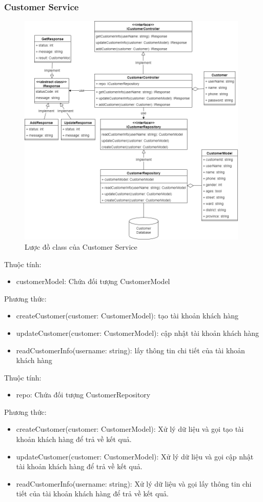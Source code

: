 \subsubsection{Customer Service}
\begin{figure}[!htp]
	\centering
	\includegraphics[width=11cm]{img/Architecture/service/CustomerService.png}
	\newline
	\caption{Lược đồ class của Customer Service}
\end{figure}

	Thuộc tính:
	\begin{itemize}
		\item customerModel: Chứa đối tượng CustomerModel
	\end{itemize}
	Phương thức:
	\begin{itemize}
		\item createCustomer(customer: CustomerModel): tạo tài khoản khách hàng
		\item updateCustomer(customer: CustomerModel): cập nhật tài khoản khách hàng
		\item readCustomerInfo(username: string): lấy thông tin chi tiết của tài khoản khách hàng
	\end{itemize}

	Thuộc tính:
	\begin{itemize}
		\item repo: Chứa đối tượng CustomerRepository
	\end{itemize}
	Phương thức:
	\begin{itemize}
		\item createCustomer(customer: CustomerModel): Xử lý dữ liệu và gọi tạo tài khoản khách hàng để trả về kết quả.
		\item updateCustomer(customer: CustomerModel): Xử lý dữ liệu và gọi cập nhật tài khoản khách hàng để trả về kết quả.
		\item readCustomerInfo(username: string): Xử lý dữ liệu và gọi lấy thông tin chi tiết của tài khoản khách hàng để trả về kết quả.
	\end{itemize}

